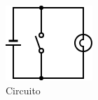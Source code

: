 \begin{frame}
\begin{columns}
		\begin{figure}[!htbp]
			\centering 
			\includegraphics[width=0.85\linewidth]{images/2_le_architetture/logic_gate_circuit_not.png}
			\caption{Circuito}
		\end{figure}
		
	\end{columns}
	
\end{frame}



